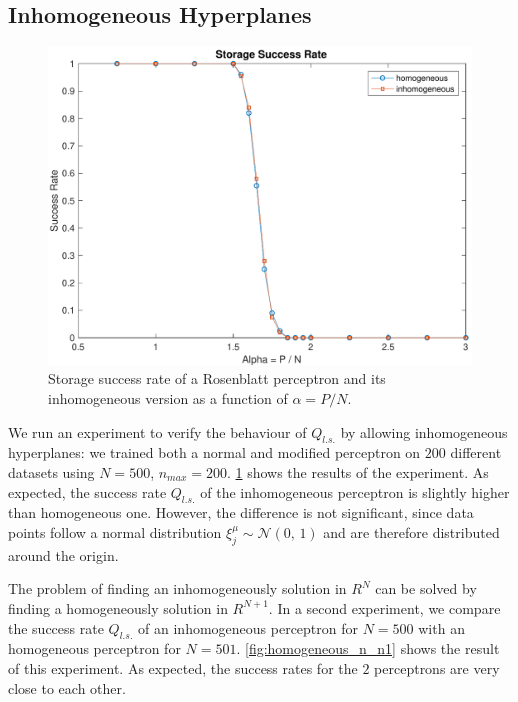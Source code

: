 \subsection{Inhomogeneous Hyperplanes}
\label{subsec:homogeneous}
\begin{figure}[t]
	\centering
	\includegraphics[width=\columnwidth]{figures/homogeneous}
    \caption{Storage success rate of a Rosenblatt perceptron and its inhomogeneous version as a function of $\alpha = P / N$.}
	\label{fig:homogeneous}
\end{figure}

We run an experiment to verify the behaviour of $Q_{l.s.}$ by allowing inhomogeneous hyperplanes:
we trained both a normal and modified perceptron on $200$ different datasets using $N = 500$, $n_{max} = 200$. 
\cref{fig:homogeneous} shows the results of the experiment.
As expected, the success rate $Q_{l.s.}$ of the inhomogeneous perceptron is slightly higher than homogeneous one.
However, the difference is not significant, since data points follow a normal distribution $\xi^\mu_j \sim \mathcal{N}(0,\,1)$ and are therefore distributed around the origin.

The problem of finding an inhomogeneously solution in $R^{N}$ can be solved by finding a homogeneously solution in $R^{N + 1}$.
In a second experiment, we compare the success rate $Q_{l.s.}$ of an inhomogeneous perceptron for $N = 500$ with an homogeneous perceptron for $N = 501$.
\cref{fig:homogeneous_n_n1} shows the result of this experiment.
As expected, the success rates for the $2$ perceptrons are very close to each other.

